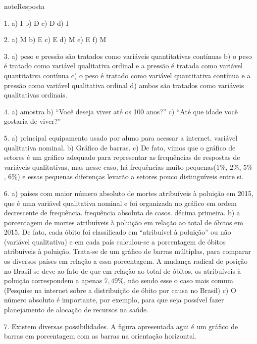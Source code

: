 \begin{sphinxadmonition}{note}{Resposta}

\(1.\) a) I b) D c) D d) I

\(2.\) a) M b) E c) E d) M e) E f) M

\(3.\) a) peso e pressão são tratados como variáveis quantitativas contínuas b) o peso é tratado como variável qualitativa ordinal e a pressão é tratada como variável quantitativa contínua c) o peso é tratado como variável quantitativa contínua e a pressão como variável qualitativa ordinal d) ambos são tratados como variáveis qualitativas ordinais.

\(4.\) a) amostra b) ``Você deseja viver até os 100 anos?'' c) ``Até que idade você gostaria de viver?''

\(5.\) a) principal equipamento usado por aluno para acessar a internet. variável qualitativa nominal. b) Gráfico de barras. c) De fato, vimos que o gráfico de setores é um gráfico adequado para representar as frequências de respostas de variáveis qualitativas, mas nesse caso, há frequências muito pequenas($1\%$, $2\%$, $5\%$, $6\%$) e essas pequenas diferenças levarão a setores pouco distinguíveis entre si.

\(6.\) a) países com maior número absoluto de mortes atribuíveis à poluição em 2015, que é uma variável qualitativa nominal e foi organizada no gráfico em ordem decrescente de frequência. frequência absoluta de casos. décima primeira. b) a porcentagem de mortes  atribuíveis à poluição em relação ao total de óbitos em 2015. De fato, cada óbito foi classificado em ``atribuível à poluição'' ou não (variável qualitativa) e em cada país calculou-se a porcentagem de óbitos atribuíveis à poluição. Trata-se de um gráfico de barras múltiplas, para comparar os diversos países em relação a essa porcentagem. A mudança radical de posição no Brasil se deve ao fato de que em relação ao total de óbitos, os atribuíveis à poluição correspondem a apenas $7{,}49\%$, não sendo esse o caso mais comum. (Pesquise na internet sobre a distribuição de óbito por causa no Brasil) c) O número absoluto é importante, por exemplo, para que seja possível fazer planejamento de alocação de recursos na saúde.

\(7.\) Existem diversas possibilidades. A figura apresentada agui é um gráfico de barras em porcentagem com as barras na orientação horizontal.
\label{\detokenize{PE103-E:id13}}\begin{quote}

\begin{figure}[H]
\centering
\capstart


\end{figure}
\end{quote}
\end{sphinxadmonition}
